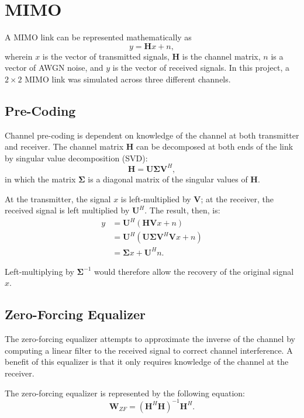 \documentclass[journal]{IEEEtran}
\begin{document}
\section{MIMO} \label{sec:MIMO}
A MIMO link can be represented mathematically as 
\begin{equation}
y = \mathbf{H}x + n,
\end{equation}
wherein $x$ is the vector of transmitted signals, $\mathbf{H}$ is the channel matrix, $n$ is a vector of AWGN noise, and $y$ is the vector of received signals. In this project, a $2\times2$ MIMO link was simulated across three different channels.

\subsection{Pre-Coding}
Channel pre-coding is dependent on knowledge of the channel at both transmitter and receiver. The channel matrix $\mathbf{H}$ can be decomposed at both ends of the link by singular value decomposition (SVD):
\begin{equation}
\mathbf{H} = \mathbf{U \Sigma V}^H,
\end{equation}
in which the matrix $\mathbf{\Sigma}$ is a diagonal matrix of the singular values of $\mathbf{H}$. 

At the transmitter, the signal $x$ is left-multiplied by $\mathbf{V}$; at the receiver, the received signal is left multiplied by $\mathbf{U}^H$. The result, then, is:
\begin{align}
y & = \mathbf{U}^H(\mathbf{HV}x + n) \\
& = \mathbf{U}^H(\mathbf{U \Sigma V}^H \mathbf{V}x + n) \\
& = \mathbf{\Sigma}x + \mathbf{U}^Hn.
\end{align}

Left-multiplying by $\mathbf{\Sigma}^{-1}$ would therefore allow the recovery of the original signal $x$.

\subsection{Zero-Forcing Equalizer}
The zero-forcing equalizer attempts to approximate the inverse of the channel by computing a linear filter to the received signal to correct channel interference. A benefit of this equalizer is that it only requires knowledge of the channel at the receiver.

The zero-forcing equalizer is represented by the following equation:
\begin{equation}
\mathbf{W}_{ZF} = (\mathbf{H}^H \mathbf{H})^{-1}\mathbf{H}^H.
\end{equation}
\end{document}
